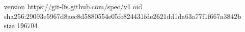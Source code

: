version https://git-lfs.github.com/spec/v1
oid sha256:29093e5967d8aec8d5880554e05fc824431fde2621dd1da63a77f1f667a3842b
size 196704
